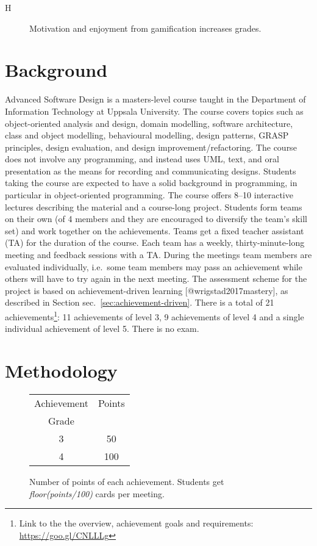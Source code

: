 \documentclass[
]{article}
\begin{document}
\begin{description}
\item[H] Motivation and enjoyment from gamification increases grades.
\end{description}

\hypertarget{background}{%
\section{Background}\label{background}}

Advanced Software Design is a masters-level course taught in the
Department of Information Technology at Uppsala University. The course
covers topics such as object-oriented analysis and design, domain
modelling, software architecture, class and object modelling,
behavioural modelling, design patterns, GRASP principles, design
evaluation, and design improvement/refactoring. The course does not
involve any programming, and instead uses UML, text, and oral
presentation as the means for recording and communicating designs.
Students taking the course are expected to have a solid background in
programming, in particular in object-oriented programming. The course
offers 8--10 interactive lectures describing the material and a
course-long project. Students form teams on their own (of 4 members and
they are encouraged to diversify the team's skill set) and work together
on the achievements. Teams get a fixed teacher assistant (TA) for the
duration of the course. Each team has a weekly, thirty-minute-long
meeting and feedback sessions with a TA. During the meetings team
members are evaluated individually, i.e.~some team members may pass an
achievement while others will have to try again in the next meeting. The
assessment scheme for the project is based on achievement-driven
learning {[}@wrigstad2017mastery{]}, as described in Section
sec.~\ref{sec:achievement-driven}. There is a total of 21
achievements\footnote{Link to the the overview, achievement goals and requirements: \url{https://goo.gl/CNLLLg}}:
11 achievements of level 3, 9 achievements of level 4 and a single
individual achievement of level 5. There is no exam.

\hypertarget{sec:methodology}{%
\section{Methodology}\label{sec:methodology}}

\begin{figure}[t]
\begin{tabular}{|c|c|}
\hline
Achievement & Points \\
Grade & \\
\hline
3 & 50 \\
\hline
4 & 100 \\
\hline
\end{tabular}
\caption{\label{fig:point-system}Number of points of each achievement. Students get \textit{floor(points/100)} cards per meeting.}
\end{figure}
\end{document}
